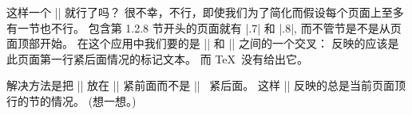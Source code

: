 \ddanger 这样一个 |\mark| 就行了吗？
很不幸，不行，即使我们为了简化而假设每个页面上至多有一节也不行。%
包含第 1.2.8 节开头的页面就有 |.7| 和 |.8|, %
而不管节是不是从页面顶部开始。%
在这个应用中我们要的是 |\topmark| 和 |\firstmark| 之间的一个交叉：
反映的应该是此页面第一行紧后面情况的标记文本。
而 \TeX\ 没有给出它。

\ddanger 解决方法是把 |\mark| 放在 |\sectionbreak| 紧前面而不是 |\leftline|~%
紧后面。%
这样 |\topmark| 反映的总是当前页面顶行的节的情况。%
(想一想。)

